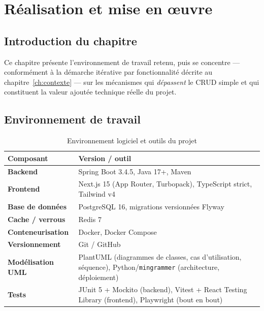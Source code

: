 \chapter{Réalisation et mise en œuvre}
\label{ch:realisation}

\section*{Introduction du chapitre}
Ce chapitre présente l'environnement de travail retenu, puis se
concentre --- conformément à la démarche itérative par fonctionnalité
décrite au chapitre~\ref{ch:contexte} --- sur les mécanismes qui
\emph{dépassent} le CRUD simple et qui constituent la valeur ajoutée
technique réelle du projet.

\section{Environnement de travail}

\begin{table}[H]
\centering
\begin{tabular}{|>{\bfseries}p{3.5cm}|p{10.5cm}|}
\toprule
Composant & Version / outil \\
\midrule
Backend & Spring Boot 3.4.5, Java 17+, Maven \\ \hline
Frontend & Next.js 15 (App Router, Turbopack), TypeScript strict, Tailwind v4 \\ \hline
Base de données & PostgreSQL 16, migrations versionnées Flyway \\ \hline
Cache / verrous & Redis 7 \\ \hline
Conteneurisation & Docker, Docker Compose \\ \hline
Versionnement & Git / GitHub \\ \hline
Modélisation UML & PlantUML (diagrammes de classes, cas d'utilisation,
  séquence), Python/\texttt{mingrammer} (architecture, déploiement) \\ \hline
Tests & JUnit 5 + Mockito (backend), Vitest + React Testing Library
  (frontend), Playwright (bout en bout) \\
\bottomrule
\end{tabular}
\caption{Environnement logiciel et outils du projet}
\label{tab:techno-outils}
\end{table}

